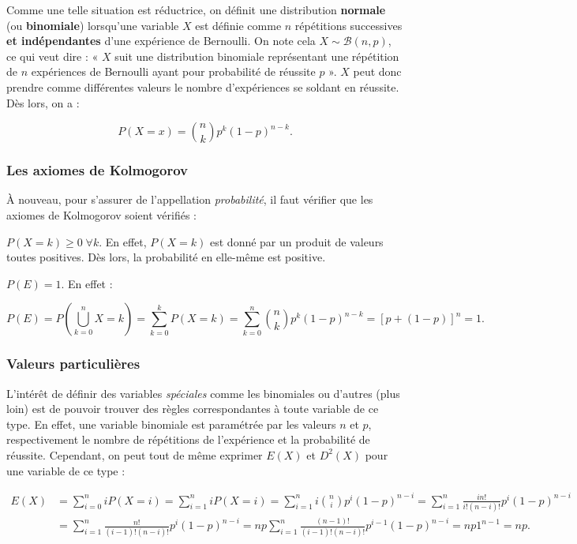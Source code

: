 \documentclass{article}
\begin{document}
		Comme une telle situation est réductrice, on définit une distribution \textbf{normale} (ou \textbf{binomiale}) lorsqu'une variable $X$ est définie comme
		$n$ répétitions successives \textbf{et indépendantes} d'une expérience de Bernoulli. On note cela $X \sim \mathcal B(n, p)$, ce qui veut dire : « $X$ suit une
		distribution binomiale représentant une répétition de $n$ expériences de Bernoulli ayant pour probabilité de réussite $p$ ». $X$ peut donc prendre comme différentes
		valeurs le nombre d'expériences se soldant en réussite. Dès lors, on a :

		\[P(X = x) = \binom nkp^k(1-p)^{n-k}.\]

		\subsubsection{Les axiomes de Kolmogorov}
			À nouveau, pour s'assurer de l'appellation \textit{probabilité}, il faut vérifier que les axiomes de Kolmogorov soient vérifiés :

			$P(X=k) \geq 0 \; \forall k$. En effet, $P(X=k)$ est donné par un produit de valeurs toutes positives. Dès lors, la probabilité en elle-même est positive.

			$P(E) = 1.$ En effet :
			
			\[P(E) = P\left(\bigcup_{k=0}^nX=k\right) = \sum_{k=0}^kP(X=k) = \sum_{k=0}^n\binom nkp^k(1-p)^{n-k} = \left[p + (1-p)\right]^n = 1.\]

		\subsubsection{Valeurs particulières}
			L'intérêt de définir des variables \textit{spéciales} comme les binomiales ou d'autres (plus loin) est de pouvoir trouver des règles correspondantes
			à toute variable de ce type. En effet, une variable binomiale est paramétrée par les valeurs $n$ et $p$, respectivement le nombre de répétitions de l'expérience
			et la probabilité de réussite. Cependant, on peut tout de même exprimer $E(X)$ et $D^2(X)$ pour une variable de ce type :

			\[\begin{aligned}
				E(X) &= \sum_{i=0}^niP(X=i) = \sum_{i=1}^niP(X=i) = \sum_{i=1}^ni\binom nip^i(1-p)^{n-i} = \sum_{i=1}^n\frac {in!}{i!(n-i)!}p^i(1-p)^{n-i} \\
				&= \sum_{i=1}^n\frac {n!}{(i-1)!(n-i)!}p^i(1-p)^{n-i} = np\sum_{i=1}^n\frac {(n-1)!}{(i-1)!(n-i)!}p^{i-1}(1-p)^{n-i} = np1^{n-1} = np.
			\end{aligned}\]
\end{document}
